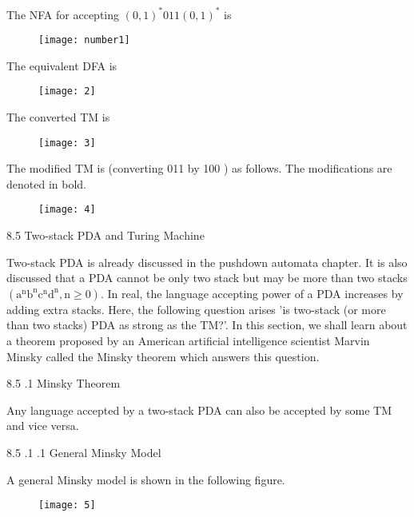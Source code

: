 \documentclass[8pt]{report}
\begin{document}
	
	
The NFA for accepting $(0,1)^{*} 011(0,1)^{*}$ is

   \begin{figure}[!ht]
	\centering
	\texttt{[image: number1]}
	
    \end{figure}

The equivalent DFA is

  \begin{figure}[!ht]
	\centering
	\texttt{[image: 2]}
	
\end{figure}



The converted TM is

  \begin{figure}[!ht]
	\centering
	\texttt{[image: 3]}
	
\end{figure}

The modified TM is (converting 011 by 100 ) as follows. The modifications are denoted in bold.

  \begin{figure}[!ht]
	\centering
	\texttt{[image: 4]}
	
\end{figure}

8.5  { Two-stack PDA and Turing Machine }

Two-stack PDA is already discussed in the pushdown automata chapter. It is also discussed that a PDA cannot be only two stack but may be more than two stacks $\left(\mathrm{a}^{\mathrm{n}} \mathrm{b}^{\mathrm{n}} \mathrm{c}^{\mathrm{n}} \mathrm{d}^{\mathrm{n}}, \mathrm{n} \geq 0\right) .$ In real, the language accepting power of a PDA increases by adding extra stacks. Here, the following question arises 'is two-stack (or more than two stacks) PDA as strong as the TM?'. In this section, we shall learn about a theorem proposed by an American artificial intelligence scientist Marvin Minsky called the Minsky theorem which answers this question.

8.5 .1  { Minsky Theorem }

Any language accepted by a two-stack PDA can also be accepted by some TM and vice versa.

8.5 .1 .1  { General Minsky Model }

A general Minsky model is shown in the following figure.

  \begin{figure}[!ht]
	\centering
	\texttt{[image: 5]}
	
\end{figure}
\end{document}
